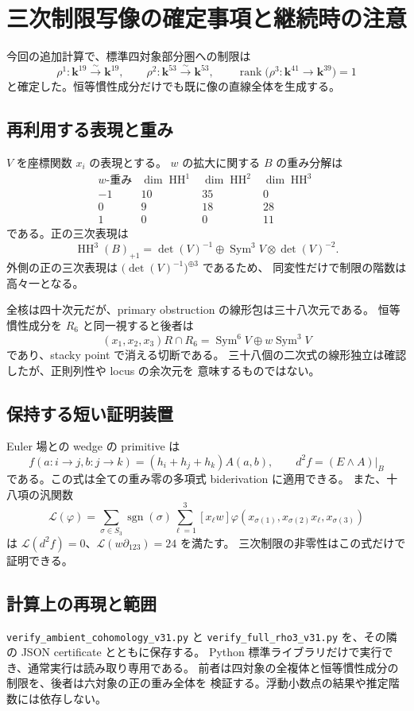 \section{三次制限写像の確定事項と継続時の注意}
\label{sec:v31c-notes}

今回の追加計算で、標準四対象部分圏への制限は
\[
 \rho^1:\mathbf k^{19}\xrightarrow{\sim}\mathbf k^{19},\qquad
 \rho^2:\mathbf k^{53}\xrightarrow{\sim}\mathbf k^{53},\qquad
 \operatorname{rank}\bigl(\rho^3:\mathbf k^{41}\to\mathbf k^{39}\bigr)=1
\]
と確定した。恒等慣性成分だけでも既に像の直線全体を生成する。

\subsection{再利用する表現と重み}
$V$ を座標関数 $x_i$ の表現とする。
$w$ の拡大に関する $B$ の重み分解は
\[
\begin{array}{c|rrr}
w\text{-重み}&\dim\operatorname{HH}^1&\dim\operatorname{HH}^2&
 \dim\operatorname{HH}^3\\\hline
-1&10&35&0\\
0&9&18&28\\
1&0&0&11
\end{array}
\]
である。正の三次表現は
\[
 \operatorname{HH}^3(B)_{+1}
 =\det(V)^{-1}\oplus\operatorname{Sym}^3V\otimes\det(V)^{-2}.
\]
外側の正の三次表現は $\bigl(\det(V)^{-1}\bigr)^{\oplus3}$ であるため、
同変性だけで制限の階数は高々一となる。

全核は四十次元だが、primary obstruction の線形包は三十八次元である。
恒等慣性成分を $R_6$ と同一視すると後者は
\[
 (x_1,x_2,x_3)R\cap R_6
 =\operatorname{Sym}^6V\oplus w\operatorname{Sym}^3V
\]
であり、stacky point で消える切断である。
三十八個の二次式の線形独立は確認したが、正則列性や locus の余次元を
意味するものではない。

\subsection{保持する短い証明装置}
Euler 場との wedge の primitive は
\[
 f(a:i\to j,b:j\to k)=(h_i+h_j+h_k)A(a,b),\qquad
 d^2f=(E\wedge A)|_B
\]
である。この式は全ての重み零の多項式 biderivation に適用できる。
また、十八項の汎関数
\[
 \mathcal L(\varphi)=\sum_{\sigma\in S_3}\operatorname{sgn}(\sigma)
 \sum_{\ell=1}^3[x_\ell w]
 \varphi(x_{\sigma(1)},x_{\sigma(2)}x_\ell,x_{\sigma(3)})
\]
は $\mathcal L(d^2f)=0$、$\mathcal L(w\partial_{123})=24$ を満たす。
三次制限の非零性はこの式だけで証明できる。

\subsection{計算上の再現と範囲}
\texttt{verify\_ambient\_cohomology\_v31.py} と
\texttt{verify\_full\_rho3\_v31.py} を、その隣の JSON certificate とともに保存する。
Python 標準ライブラリだけで実行でき、通常実行は読み取り専用である。
前者は四対象の全複体と恒等慣性成分の制限を、後者は六対象の正の重み全体を
検証する。浮動小数点の結果や推定階数には依存しない。

